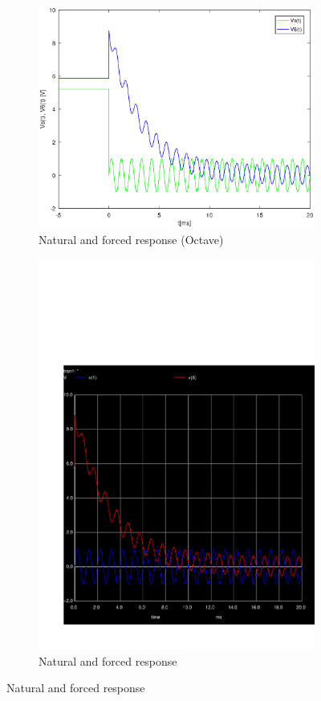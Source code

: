 \begin{figure}[h] 
\centering
\begin{subfigure}{0.5\textwidth}
\includegraphics[width=\textwidth]{Solution.eps}
\caption{Natural and forced response (Octave)}
\label{fig:first}
\end{subfigure}
\begin{subfigure}{0.42\textwidth}
\includegraphics[width=\textwidth]{sim4.pdf}
\caption{Natural and forced response}
\label{fig:second}
\end{subfigure}
\end{figure}

